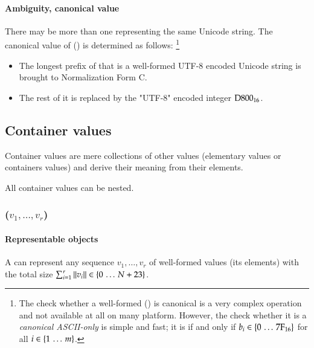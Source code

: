 \paragraph{Ambiguity, canonical value}

There may be more than one  representing the same Unicode string.
The canonical value of () is determined
as follows:%
\footnote{
    The check whether a well-formed () is canonical
    is a very complex operation and not available at all on many platform.
    However, the check whether it is a \emph{canonical ASCII-only}  is simple and fast;
    it is if and only if $b_i \in \{0 \,\ldots\, \mathrm{7F}_{16}\}$ for all $i \in \{1 \,\ldots\, m\}$.
}
\begin{itemize}
    \item
    The longest prefix of  that is a well-formed UTF-8 encoded Unicode string
    is brought to Normalization Form C.

    \item
    The rest of it is replaced by the "UTF-8" encoded integer $\mathrm{D800}_{16}$.
\end{itemize}


\subsection{Container values}

Container values are mere collections of other values (elementary values or containers values) and derive their
meaning from their elements.

All container values can be nested.


\subsubsection{($v_1, \ldots, v_r$)}
\hypertarget{sec:def:SequenceValue}{}

\paragraph{Representable objects}

A  can represent any sequence $v_1, \ldots, v_r$
of well-formed values (its elements) with the total size $\sum_{i = 1}^r \|v_i\| \in \{0 \,\ldots\, N + 23\}$.

